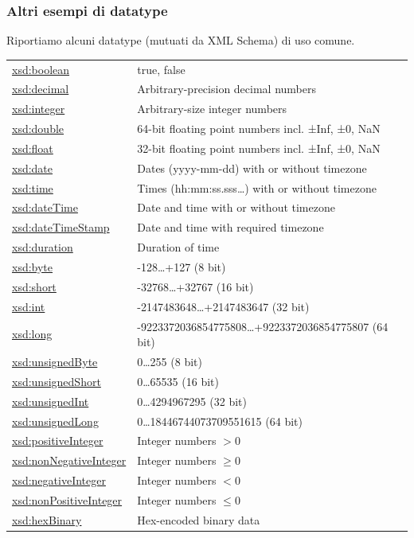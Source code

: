 \documentclass[8pt]{beamer}
\begin{document}
\begin{frame}
 \frametitle{Altri esempi di datatype}
Riportiamo alcuni datatype (mutuati da XML Schema) di uso comune.

\begin{small}
\begin{tabular}{|l|l|}
 \hline
\url{xsd:boolean} & true, false\\
\url{xsd:decimal} & Arbitrary-precision decimal numbers\\
\url{xsd:integer} & Arbitrary-size integer numbers\\
\url{xsd:double} & 64-bit floating point numbers incl. ±Inf, ±0, NaN\\
\url{xsd:float} & 32-bit floating point numbers incl. ±Inf, ±0, NaN\\
\url{xsd:date} & Dates (yyyy-mm-dd) with or without timezone\\
\url{xsd:time} & Times (hh:mm:ss.sss…) with or without timezone\\
\url{xsd:dateTime} & Date and time with or without timezone\\
\url{xsd:dateTimeStamp} & Date and time with required timezone\\
\url{xsd:duration} & Duration of time\\
\url{xsd:byte} & -128\ldots+127 (8 bit)\\
\url{xsd:short} & -32768\ldots+32767 (16 bit) \\
\url{xsd:int} & -2147483648\ldots+2147483647 (32 bit)\\
\url{xsd:long} & -9223372036854775808\ldots+9223372036854775807 (64 bit)\\
\url{xsd:unsignedByte} & 0\ldots255 (8 bit)\\
\url{xsd:unsignedShort} & 0\ldots65535 (16 bit)\\
\url{xsd:unsignedInt} & 0\ldots4294967295 (32 bit)\\
\url{xsd:unsignedLong} & 0\ldots18446744073709551615 (64 bit)\\
\url{xsd:positiveInteger} & Integer numbers $>0$\\
\url{xsd:nonNegativeInteger} & Integer numbers $\geq 0$\\
\url{xsd:negativeInteger} & Integer numbers $<0$\\
\url{xsd:nonPositiveInteger} & Integer numbers $\leq 0$\\
\url{xsd:hexBinary} & Hex-encoded binary data\\
\hline
\end{tabular}
\end{small}
\end{frame}
\end{document}
